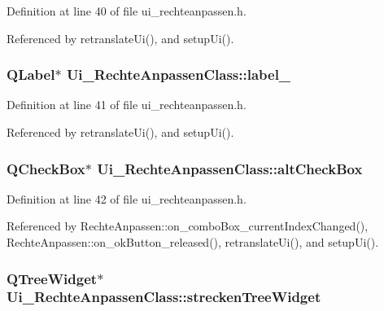 Definition at line 40 of file ui\_\-rechteanpassen.h.

Referenced by retranslateUi(), and setupUi().\hypertarget{class_ui___rechte_anpassen_class_acc08a056b27054b47bd83671be0ac99}{
\subsubsection[label\_\-7]{\setlength{\rightskip}{0pt plus 5cm}QLabel$\ast$ {\bf Ui\_\-RechteAnpassenClass::label\_}}}
\label{class_ui___rechte_anpassen_class_acc08a056b27054b47bd83671be0ac99}




Definition at line 41 of file ui\_\-rechteanpassen.h.

Referenced by retranslateUi(), and setupUi().\hypertarget{class_ui___rechte_anpassen_class_546275f181e81eed8bbdd84be95b0364}{
\subsubsection[altCheckBox]{\setlength{\rightskip}{0pt plus 5cm}QCheckBox$\ast$ {\bf Ui\_\-RechteAnpassenClass::altCheckBox}}}
\label{class_ui___rechte_anpassen_class_546275f181e81eed8bbdd84be95b0364}




Definition at line 42 of file ui\_\-rechteanpassen.h.

Referenced by RechteAnpassen::on\_\-comboBox\_\-currentIndexChanged(), RechteAnpassen::on\_\-okButton\_\-released(), retranslateUi(), and setupUi().\hypertarget{class_ui___rechte_anpassen_class_0ac80f46dd0455d8500dadc483913950}{
\subsubsection[streckenTreeWidget]{\setlength{\rightskip}{0pt plus 5cm}QTreeWidget$\ast$ {\bf Ui\_\-RechteAnpassenClass::streckenTreeWidget}}}
\label{class_ui___rechte_anpassen_class_0ac80f46dd0455d8500dadc483913950}




